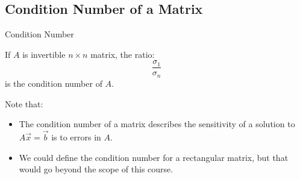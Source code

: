 \subsection{Condition Number of a Matrix}
\begin{definition} Condition Number

    If \(A\) is invertible \(n \times n\) matrix, the ratio:
    \[\frac{\sigma_1}{\sigma_n}\]
    is the condition number of \(A\).

    Note that:
    \begin{itemize}
        \item The condition number of a matrix describes the sensitivity of a solution to \(A \Vec{x} = \Vec{b}\) is to errors in \(A\).
        \item We could define the condition number for a rectangular matrix, but that would go beyond the scope of this course.
    \end{itemize}
\end{definition}